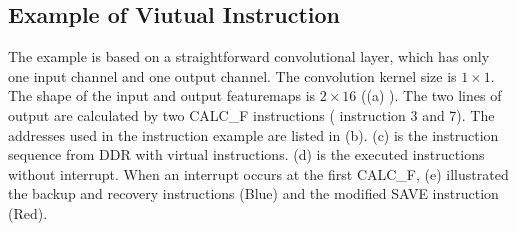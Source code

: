 \subsection{Example of Viutual Instruction}
\label{sec:exampleVirtual}


The example is based on a straightforward convolutional layer, which has only one input channel and one output channel. 
The convolution kernel size is $1 \times 1$. The shape of the input and output featuremaps is $ 2 \times 16 $ ((a) ). The two lines of output are calculated by two CALC\_F instructions ( instruction 3 and 7). The addresses used in the instruction example are listed in (b). (c) is the instruction sequence from DDR with virtual instructions. (d) is the executed instructions without interrupt. When an interrupt occurs at the first CALC\_F, (e) illustrated the backup and recovery instructions (Blue) and the modified SAVE instruction (Red).


